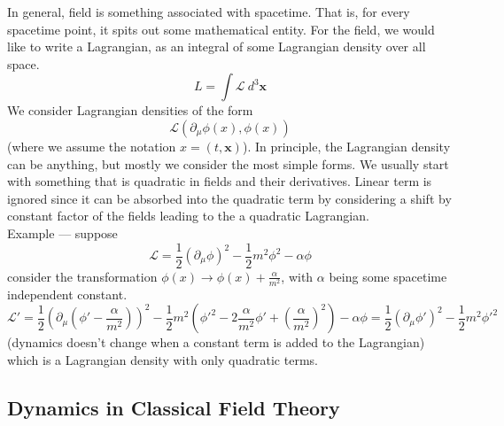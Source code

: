 \documentclass[11pt]{article}
\newcommand{\del}{\partial}
\newcommand{\ld}{\mathcal{L}}
\numberwithin{equation}{section}
\begin{document}
    In general, field is something associated with spacetime. That is, for every spacetime point, it spits out some mathematical entity. For the field, we would like to write a Lagrangian, as an integral of some Lagrangian density over all space. 
    \begin{equation}
        L = \int\ld ~d^3\textbf{x}
    \end{equation}
    We consider Lagrangian densities of the form 
    \begin{equation}
        \ld(\del_\mu \phi(x), \phi(x))
    \end{equation}
    (where we assume the notation \(x = (t, \textbf{x})\)). In principle, the Lagrangian density can be anything, but mostly we consider the most simple forms. We usually start with something that is quadratic in fields and their derivatives. Linear term is ignored since it can be absorbed into the quadratic term by considering a shift by constant factor of the fields leading to the a quadratic Lagrangian.\\
    Example — suppose
    \begin{equation}
        \ld = \frac{1}{2} (\del_\mu \phi)^2 - \frac{1}{2}m^2 \phi^2 - \alpha \phi
    \end{equation}
    consider the transformation \(\phi(x) \to \phi(x) + \displaystyle\frac{\alpha}{m^2}\), with \(\alpha\) being some spacetime independent constant. 
    \begin{equation}
        \ld' = \frac{1}{2} \left( \del_\mu \left(\phi' - \frac{\alpha}{m^2}\right)\right)^2 - \frac{1}{2} m^2 \left(\phi'^2 - 2\frac{\alpha}{m^2} \phi' + \left(\frac{\alpha}{m^2}\right)^2\right) - \alpha \phi = \frac{1}{2} (\del_\mu \phi')^2 - \frac{1}{2}m^2 \phi'^2
    \end{equation}
    (dynamics doesn't change when a constant term is added to the Lagrangian) which is a Lagrangian density with only quadratic terms. 

    \subsection{Dynamics in Classical Field Theory}
\end{document}
